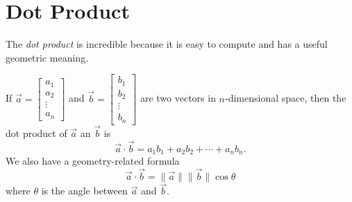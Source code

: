 \documentclass[letter]{article}
\begin{document}
\section*{Dot Product}
	The \emph{dot product} is incredible because it is easy to compute and has a useful
	geometric meaning.

	If $\vec a=\begin{bmatrix}a_1\\ a_2\\ \vdots \\ a_n\end{bmatrix}$ and 
	$\vec b=\begin{bmatrix}b_1\\ b_2\\ \vdots \\ b_n\end{bmatrix}$ are two vectors in $n$-dimensional
	space, then the dot product of $\vec a$ an $\vec b$ is
	\[
		\vec a\cdot\vec b = a_1b_1+a_2b_2+\cdots+a_nb_n.
	\]
	We also have a geometry-related formula
	\[
		\vec a\cdot \vec b = \|\vec a\|\|\vec b\|\cos \theta
	\]
	where $\theta$ is the angle between $\vec a$ and $\vec b$.
	
\end{document}
